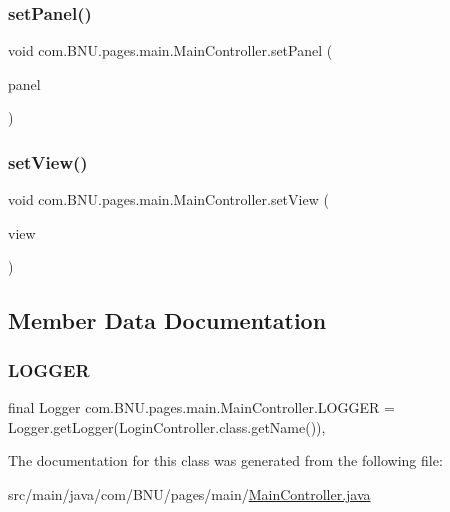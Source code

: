 \subsubsection{\texorpdfstring{set\+Panel()}{setPanel()}}
{\footnotesize\ttfamily void com.\+B\+N\+U.\+pages.\+main.\+Main\+Controller.\+set\+Panel (\begin{DoxyParamCaption}\item[{J\+Panel}]{panel }\end{DoxyParamCaption})}

\mbox{\label{classcom_1_1_b_n_u_1_1pages_1_1main_1_1_main_controller_aaaf8441764f8c8eb9a91d65eb2a5ea43}} 
\subsubsection{\texorpdfstring{set\+View()}{setView()}}
{\footnotesize\ttfamily void com.\+B\+N\+U.\+pages.\+main.\+Main\+Controller.\+set\+View (\begin{DoxyParamCaption}\item[{\mbox{\hyperlink{classcom_1_1_b_n_u_1_1pages_1_1main_1_1_main_view}{Main\+View}}}]{view }\end{DoxyParamCaption})}



\subsection{Member Data Documentation}
\mbox{\label{classcom_1_1_b_n_u_1_1pages_1_1main_1_1_main_controller_ad6e2c0c2a4ce8e860519ac5138fbe16e}} 
\subsubsection{\texorpdfstring{L\+O\+G\+G\+ER}{LOGGER}}
{\footnotesize\ttfamily final Logger com.\+B\+N\+U.\+pages.\+main.\+Main\+Controller.\+L\+O\+G\+G\+ER = Logger.\+get\+Logger(Login\+Controller.\+class.\+get\+Name())\hspace{0.3cm}{\ttfamily [static]}, {\ttfamily [private]}}



The documentation for this class was generated from the following file\+:\begin{DoxyCompactItemize}
\item 
src/main/java/com/\+B\+N\+U/pages/main/\mbox{\hyperlink{_main_controller_8java}{Main\+Controller.\+java}}\end{DoxyCompactItemize}
